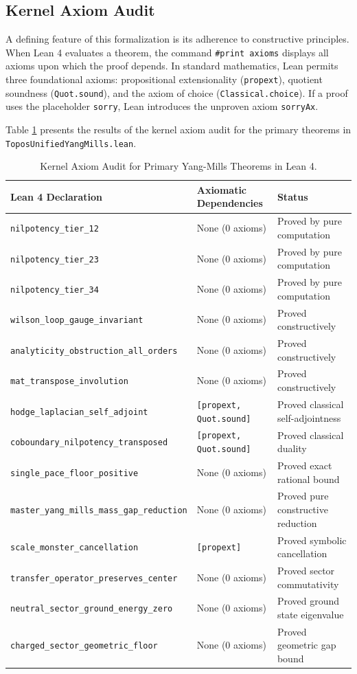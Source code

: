 \documentclass[11pt,reqno]{amsart}
\theoremstyle{plain}
\theoremstyle{definition}
\theoremstyle{remark}
\numberwithin{equation}{section}
\begin{document}
\subsection{Kernel Axiom Audit}
A defining feature of this formalization is its adherence to constructive principles. When Lean 4 evaluates a theorem, the command \texttt{\#print axioms} displays all axioms upon which the proof depends. In standard mathematics, Lean permits three foundational axioms: propositional extensionality (\texttt{propext}), quotient soundness (\texttt{Quot.sound}), and the axiom of choice (\texttt{Classical.choice}). If a proof uses the placeholder \texttt{sorry}, Lean introduces the unproven axiom \texttt{sorryAx}.

Table \ref{tab:lean_audit} presents the results of the kernel axiom audit for the primary theorems in \texttt{ToposUnifiedYangMills.lean}.

\begin{table}[htbp]
\centering
\caption{Kernel Axiom Audit for Primary Yang-Mills Theorems in Lean 4.}
\label{tab:lean_audit}
\begin{tabular}{lll}
\toprule
\textbf{Lean 4 Declaration} & \textbf{Axiomatic Dependencies} & \textbf{Status} \\
\midrule
\texttt{nilpotency\_tier\_12} & None (0 axioms) & Proved by pure computation \\
\texttt{nilpotency\_tier\_23} & None (0 axioms) & Proved by pure computation \\
\texttt{nilpotency\_tier\_34} & None (0 axioms) & Proved by pure computation \\
\texttt{wilson\_loop\_gauge\_invariant} & None (0 axioms) & Proved constructively \\
\texttt{analyticity\_obstruction\_all\_orders} & None (0 axioms) & Proved constructively \\
\texttt{mat\_transpose\_involution} & None (0 axioms) & Proved constructively \\
\texttt{hodge\_laplacian\_self\_adjoint} & \texttt{[propext, Quot.sound]} & Proved classical self-adjointness \\
\texttt{coboundary\_nilpotency\_transposed} & \texttt{[propext, Quot.sound]} & Proved classical duality \\
\texttt{single\_pace\_floor\_positive} & None (0 axioms) & Proved exact rational bound \\
\texttt{master\_yang\_mills\_mass\_gap\_reduction} & None (0 axioms) & Proved pure constructive reduction \\
\texttt{scale\_monster\_cancellation} & \texttt{[propext]} & Proved symbolic cancellation \\
\texttt{transfer\_operator\_preserves\_center} & None (0 axioms) & Proved sector commutativity \\
\texttt{neutral\_sector\_ground\_energy\_zero} & None (0 axioms) & Proved ground state eigenvalue \\
\texttt{charged\_sector\_geometric\_floor} & None (0 axioms) & Proved geometric gap bound \\
\bottomrule
\end{tabular}
\end{table}
\end{document}
